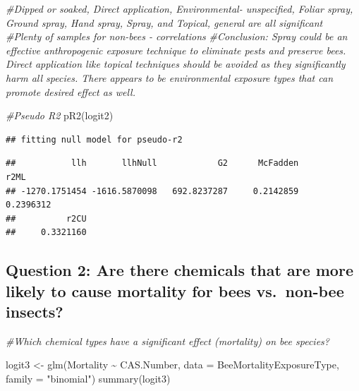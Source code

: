 \documentclass[
  12pt,
]{article}
\newenvironment{Shaded}{\begin{snugshade}}{\end{snugshade}}
\newcommand{\AttributeTok}[1]{\textcolor[rgb]{0.77,0.63,0.00}{#1}}
\newcommand{\CommentTok}[1]{\textcolor[rgb]{0.56,0.35,0.01}{\textit{#1}}}
\newcommand{\FunctionTok}[1]{\textcolor[rgb]{0.00,0.00,0.00}{#1}}
\newcommand{\NormalTok}[1]{#1}
\newcommand{\OtherTok}[1]{\textcolor[rgb]{0.56,0.35,0.01}{#1}}
\newcommand{\SpecialCharTok}[1]{\textcolor[rgb]{0.00,0.00,0.00}{#1}}
\newcommand{\StringTok}[1]{\textcolor[rgb]{0.31,0.60,0.02}{#1}}
\begin{document}
\begin{Shaded}
\begin{Highlighting}[]
\CommentTok{\#Dipped or soaked, Direct application, Environmental{-} unspecified, Foliar spray, Ground spray, Hand spray, Spray, and Topical, general are all significant }
\CommentTok{\#Plenty of samples for non{-}bees {-} correlations  }
\CommentTok{\#Conclusion: Spray could be an effective anthropogenic exposure technique to eliminate pests and preserve bees. Direct application like topical techniques should be avoided as they significantly harm all species. There appears to be environmental exposure types that can promote desired effect as well.}

\CommentTok{\#Pseudo R2}
 \FunctionTok{pR2}\NormalTok{(logit2)}
\end{Highlighting}
\end{Shaded}

\begin{verbatim}
## fitting null model for pseudo-r2
\end{verbatim}

\begin{verbatim}
##           llh       llhNull            G2      McFadden          r2ML 
## -1270.1751454 -1616.5870098   692.8237287     0.2142859     0.2396312 
##          r2CU 
##     0.3321160
\end{verbatim}

\hypertarget{question-2-are-there-chemicals-that-are-more-likely-to-cause-mortality-for-bees-vs.-non-bee-insects}{%
\subsection{Question 2: Are there chemicals that are more likely to
cause mortality for bees vs.~non-bee
insects?}\label{question-2-are-there-chemicals-that-are-more-likely-to-cause-mortality-for-bees-vs.-non-bee-insects}}

\begin{Shaded}
\begin{Highlighting}[]
\CommentTok{\#Which chemical types have a significant effect (mortality) on bee species?}

\NormalTok{logit3 }\OtherTok{\textless{}{-}} \FunctionTok{glm}\NormalTok{(Mortality }\SpecialCharTok{\textasciitilde{}}\NormalTok{ CAS.Number, }\AttributeTok{data =}\NormalTok{ BeeMortalityExposureType, }\AttributeTok{family =} \StringTok{"binomial"}\NormalTok{)}
\FunctionTok{summary}\NormalTok{(logit3)}
\end{Highlighting}
\end{Shaded}
\end{document}
